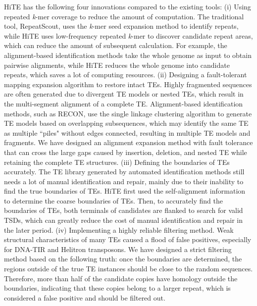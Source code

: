 \documentclass{bmcart}
\begin{document}
HiTE has the following four innovations compared to the existing tools: (i) Using repeated \emph{k}-mer coverage to reduce the amount of computation. The traditional tool, RepeatScout, uses the \emph{k}-mer seed expansion method to identify repeats, while HiTE uses low-frequency repeated \emph{k}-mer to discover candidate repeat areas, which can reduce the amount of subsequent calculation. For example, the alignment-based identification methods take the whole genome as input to obtain pairwise alignments, while HiTE reduces the whole genome into candidate repeats, which saves a lot of computing resources. (ii) Designing a fault-tolerant mapping expansion algorithm to restore intact TEs. Highly fragmented sequences are often generated due to divergent TE models or nested TEs, which result in the multi-segment alignment of a complete TE. Alignment-based identification methods, such as RECON, use the single linkage clustering algorithm to generate TE models based on overlapping subsequences, which may identify the same TE as multiple ``piles" without edges connected, resulting in multiple TE models and fragments. We have designed an alignment expansion method with fault tolerance that can cross the large gaps caused by insertion, deletion, and nested TE while retaining the complete TE structures. (iii) Defining the boundaries of TEs accurately. The TE library generated by automated identification methods still needs a lot of manual identification and repair\cite{storer2022methodologies}, mainly due to their inability to find the true boundaries of TEs. HiTE first used the self-alignment information to determine the coarse boundaries of TEs. Then, to accurately find the boundaries of TEs, both terminals of candidates are flanked to search for valid TSDs, which can greatly reduce the cost of manual identification and repair in the later period. (iv) Implementing a highly reliable filtering method. Weak structural characteristics of many TEs caused a flood of false positives, especially for DNA-TIR and Helitron transposons. We have designed a strict filtering method based on the following truth: once the boundaries are determined, the regions outside of the true TE instances should be close to the random sequences. Therefore, more than half of the candidate copies have homology outside the boundaries, indicating that these copies belong to a larger repeat, which is considered a false positive and should be filtered out.
\end{document}
